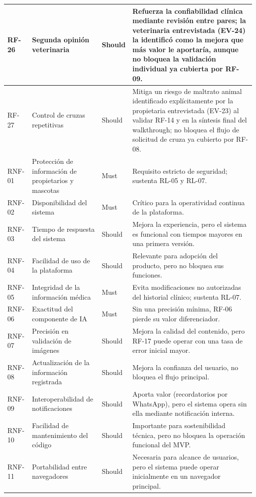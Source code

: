\documentclass[journal,onecolumn]{IEEEtran}
\begin{document}
\begin{longtable}{@{}p{1.6cm} p{4.8cm} p{1.6cm} p{5.2cm}@{}}
		\hline
		RF-26 & Segunda opinión veterinaria & Should & Refuerza la confiabilidad clínica mediante revisión entre pares; la veterinaria entrevistada (EV-24) la identificó como la mejora que más valor le aportaría, aunque no bloquea la validación individual ya cubierta por RF-09. \\
		\hline
		RF-27 & Control de cruzas repetitivas & Should & Mitiga un riesgo de maltrato animal identificado explícitamente por la propietaria entrevistada (EV-23) al validar RF-14 y en la síntesis final del walkthrough; no bloquea el flujo de solicitud de cruza ya cubierto por RF-08. \\
		\hline
		RNF-01 & Protección de información de propietarios y mascotas & Must & Requisito estricto de seguridad; sustenta RL-05 y RL-07. \\
		\hline
		RNF-02 & Disponibilidad del sistema & Must & Crítico para la operatividad continua de la plataforma. \\
		\hline
		RNF-03 & Tiempo de respuesta del sistema & Should & Mejora la experiencia, pero el sistema es funcional con tiempos mayores en una primera versión. \\
		\hline
		RNF-04 & Facilidad de uso de la plataforma & Should & Relevante para adopción del producto, pero no bloquea sus funciones. \\
		\hline
		RNF-05 & Integridad de la información médica & Must & Evita modificaciones no autorizadas del historial clínico; sustenta RL-07. \\
		\hline
		RNF-06 & Exactitud del componente de IA & Must & Sin una precisión mínima, RF-06 pierde su valor diferenciador. \\
		\hline
		RNF-07 & Precisión en validación de imágenes & Should & Mejora la calidad del contenido, pero RF-17 puede operar con una tasa de error inicial mayor. \\
		\hline
		RNF-08 & Actualización de la información registrada & Should & Mejora la confianza del usuario, no bloquea el flujo principal. \\
		\hline
		RNF-09 & Interoperabilidad de notificaciones & Should & Aporta valor (recordatorios por WhatsApp), pero el sistema opera sin ella mediante notificación interna. \\
		\hline
		RNF-10 & Facilidad de mantenimiento del código & Should & Importante para sostenibilidad técnica, pero no bloquea la operación funcional del MVP. \\
		\hline
		RNF-11 & Portabilidad entre navegadores & Should & Necesaria para alcance de usuarios, pero el sistema puede operar inicialmente en un navegador principal. \\

\end{longtable}
\end{document}
